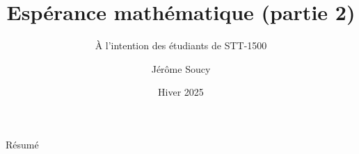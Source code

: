 \documentclass[nuit,charter,pied]{BeamerJS}
\title{Espérance mathématique (partie 2)}
\subtitle{À l'intention des étudiants de STT-1500}
\institute{Université Laval}
\author{Jérôme Soucy}
\date{Hiver 2025}
\begin{document}
\begin{frame}
	\titlepage
\end{frame}

\begin{frame}{Résumé}
\tableofcontents
\end{frame}
%
\end{document}

